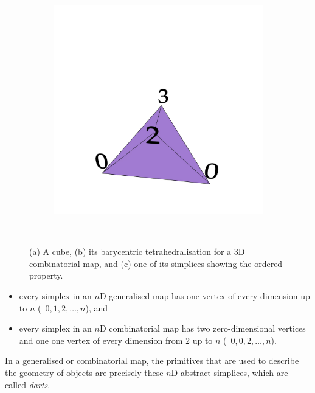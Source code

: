 \begin{figure}
\begin{subfigure}{0.33\linewidth}
\caption{}%
\label{subfig:cmap-3d}
\end{subfigure}%
\begin{subfigure}{0.33\linewidth}
\includegraphics[width=\linewidth]{figs/cmap-3d-vertices}
\caption{}%
\label{subfig:cmap-3d-vertices}
\end{subfigure}\\
\caption{(a) A cube, (b) its barycentric tetrahedralisation for a 3D combinatorial map, and (c) one of its simplices showing the ordered property.}%
\label{fig:cmap-3d}
\end{figure}

\begin{itemize}
\item every simplex in an \(n\)D generalised map has one vertex of every dimension up to \(n\) (\ie\ \(0, 1, 2, \ldots, n\)), and
\item every simplex in an \(n\)D combinatorial map has two zero-dimensional vertices and one one vertex of every dimension from \(2\) up to \(n\) (\ie\ \(0, 0, 2, \ldots, n\)).
\end{itemize}

In a generalised or combinatorial map, the primitives that are used to describe the geometry of objects are precisely these \(n\)D abstract simplices, which are called \emph{darts}.

